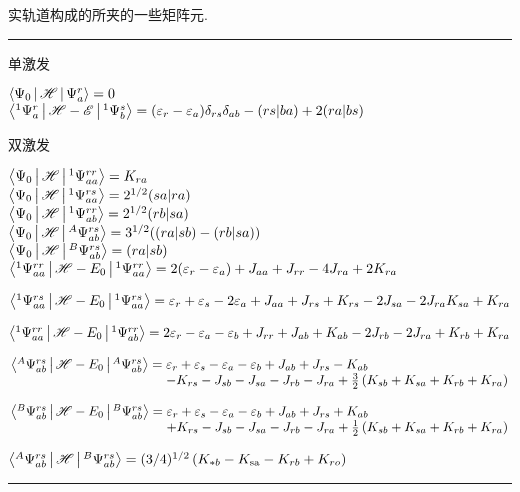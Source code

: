 \begin{table}[H]
		\caption{{实轨道构成的}所夹的一些矩阵元.}
		\label{table4.1}
		\hrule
		\vspace{5pt}
        单激发\par
        $\Braket{\Psi_0|\mathscr{H}|\Psi_{a}^{r}} = 0$\\
        $\Braket{^1\Psi_a^r|\mathscr{H}-\mathscr{E}|^1\Psi_b^s} = (\varepsilon_r-\varepsilon_a)\delta_{rs}\delta_{ab}-(rs|ba)+2(ra|bs)$
        \par
        \mbox{}\par
        双激发\par
        $\Braket{\Psi_0|\mathscr{H}|^1\Psi_{aa}^{rr}}  = K_{ra}$\\
        $\Braket{\Psi_0|\mathscr{H}|^1\Psi_{aa}^{rs}} = 2^{1/2}(sa|ra)$\\
        $\Braket{\Psi_0|\mathscr{H}|^1\Psi_{ab}^{rr}} = 2^{1/2}(rb|sa)$\\
        $\Braket{\Psi_0|\mathscr{H}|^A\Psi_{ab}^{rs}} = 3^{1/2}((ra|sb)-(rb|sa))$\\
        $\Braket{\Psi_0|\mathscr{H}|^B\Psi_{ab}^{rs}} = (ra|sb)$\\
        $\Braket{^1\Psi_{aa}^{rr}|\mathscr{H}-E_0|^1\Psi_{aa}^{rr}} = 2(\varepsilon_r-\varepsilon_a) + J_{aa} + J_{rr} -4J_{ra} + 2K_{ra}
        $\par
        $\Braket{^1\Psi_{aa}^{rs}|\mathscr{H}-E_0|^1\Psi_{aa}^{rs}} = \varepsilon_r+\varepsilon_s -2\varepsilon_{a}+ J_{aa} + J_{rs} +K_{rs} -2J_{sa} -2J_{ra} K_{sa} + K_{ra}
        $\par
        $\Braket{^1\Psi_{aa}^{rr}|\mathscr{H}-E_0|^1\Psi_{ab}^{rr}} = 2\varepsilon_r-\varepsilon_a -\varepsilon_{b}+ J_{rr} + J_{ab} +K_{ab} -2J_{rb} -2J_{ra} + K_{rb} + K_{ra}
        $\par
        $\arraycolsep=1.4pt
        \begin{array}[t]{ll}
        	\braket{^A\Psi_{ab}^{rs}|\hs-E_0|^A\Psi_{ab}^{rs}} = & \epsilon_{r}+\epsilon_{s}-\epsilon_{a}-\epsilon_{b}+J_{a b}+J_{r s}-K_{a b}                      \\
        	                                                     & -K_{r s}-J_{s b}-J_{s a}-J_{r b}-J_{r a}+\frac{3}{2}\left(K_{s b}+K_{s a}+K_{r b}+K_{r a}\right)
        \end{array}$\par
        $\arraycolsep=1.4pt
        \begin{array}[t]{ll}
        	\braket{^B\Psi_{ab}^{rs}|\hs-E_0|^B\Psi_{ab}^{rs}} = & \varepsilon_{r}+\varepsilon_{s}-\varepsilon_{a}-\varepsilon_{b}+J_{a b}+J_{r s}+K_{a b}          \\
        	                                                     & +K_{r s}-J_{s b}-J_{s a}-J_{r b}-J_{r a}+\frac{1}{2}\left(K_{s b}+K_{s a}+K_{r b}+K_{r a}\right)
        \end{array}$\par
        $\Braket{^A\Psi_{ab}^{rs}|\mathscr{H}|^B\Psi_{ab}^{rs}}=(3 / 4)^{1 / 2}\left(K_{* b}-K_{\mathrm{sa}}-K_{r b}+K_{r o}\right)$
        \vspace{5pt}
		\hrule
	\end{table}


